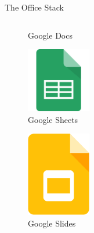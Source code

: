 \documentclass[10pt]{beamer}
\begin{document}
\begin{frame}{The Office Stack}
\begin{columns}[T]
\begin{column}{0.33\textwidth}
\begin{figure}
                    \caption{Google Docs}
                \end{figure}
                \begin{figure}
                    \centering
                    \includegraphics[width=0.25\textwidth]{images/google-sheets}
                    \caption{Google Sheets}
                \end{figure}
                \begin{figure}
                    \centering
                    \includegraphics[width=0.25\textwidth]{images/google-slides}
                    \caption{Google Slides}
                \end{figure}
            \end{column}
        \end{columns}
    \end{frame}
\end{document}
